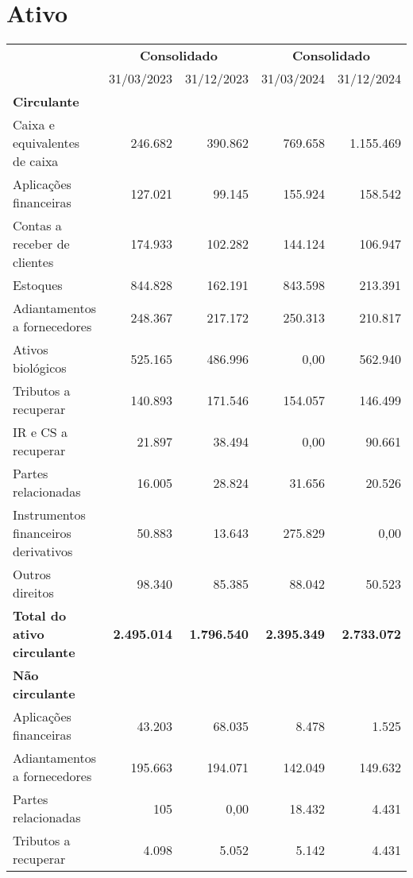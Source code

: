 \documentclass[1pt,a4paper]{article}
\begin{document}
		\centering\section*{Ativo}
		\begin{longtable}{p{6cm}r r r r }
			\toprule
			& \multicolumn{2}{c}{\textbf{Consolidado}} & \multicolumn{2}{c}{\textbf{Consolidado}} \\
			\cmidrule(lr){2-3} \cmidrule(lr){4-5}
			& 31/03/2023 & 31/12/2023 & 31/03/2024 & 31/12/2024 \\
			\midrule
			\endhead
			\textbf{Circulante} & & & & \\
			Caixa e equivalentes de caixa & 246.682 & 390.862 & 769.658 & 1.155.469 \\
			Aplicações financeiras & 127.021 & 99.145 & 155.924 & 158.542 \\
			Contas a receber de clientes & 174.933 & 102.282 & 144.124 & 106.947 \\
			Estoques & 844.828 & 162.191 & 843.598 & 213.391 \\
			Adiantamentos a fornecedores & 248.367 & 217.172 & 250.313 & 210.817 \\
			Ativos biológicos & 525.165 & 486.996 & 0,00 & 562.940 \\
			Tributos a recuperar & 140.893 & 171.546 & 154.057 & 146.499 \\
			IR e CS a recuperar & 21.897 & 38.494 & 0,00 & 90.661 \\
			Partes relacionadas & 16.005 & 28.824 & 31.656 & 20.526 \\
			Instrumentos financeiros derivativos & 50.883 & 13.643 & 275.829 & 0,00 \\
			Outros direitos & 98.340 & 85.385 & 88.042 & 50.523 \\
			\rowcolor{darkgray}\textbf{Total do ativo circulante} & \textbf{2.495.014} & \textbf{1.796.540} & \textbf{2.395.349} & \textbf{2.733.072} \\
			\midrule
			\textbf{Não circulante} & & & & \\
			Aplicações financeiras & 43.203 & 68.035& 8.478 & 1.525 \\
			Adiantamentos a fornecedores & 195.663 & 194.071 & 142.049 & 149.632 \\
			Partes relacionadas & 105 & 0,00 & 18.432 & 4.431 \\
			Tributos a recuperar & 4.098 & 5.052 & 5.142 & 4.431 \\

\end{longtable}
\end{document}
